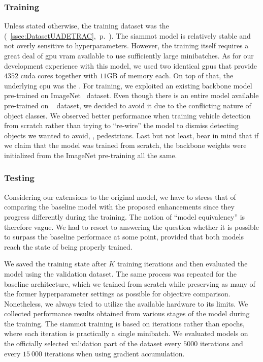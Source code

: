 \subsubsection{Training}

Unless stated otherwise, the training dataset was the \uadetrac{} (\sectiontext{}~\ref{ssec:DatasetUADETRAC},~p.~\pageref{ssec:DatasetUADETRAC}). The \gls{siammot} model is relatively stable and not overly sensitive to hyperparameters. However, the training itself requires a great deal of \gls{gpu} \gls{vram} available to use sufficiently large minibatches. As for our development experience with this model, we used two identical \usedgpu{} \glspl{gpu} that provide $4352$ \gls{cuda} cores together with $11$GB of memory each. On top of that, the underlying \gls{cpu} was the \usedcpu{}. For training, we exploited an existing backbone model pre-trained on ImageNet~\cite{deng2009imagenet} dataset. Even though there is an entire model available pre-trained on \mscoco{}~\cite{lin2014mscoco} dataset, we decided to avoid it due to the conflicting nature of object classes. We observed better performance when training vehicle detection from scratch rather than trying to ``re-wire'' the model to dismiss detecting objects we wanted to avoid, \egtext{}, pedestrians. Last but not least, bear in mind that if we claim that the model was trained from scratch, the backbone weights were initialized from the ImageNet pre-training all the same.

\subsubsection{Testing}

Considering our extensions to the original model, we have to stress that of comparing the baseline model with the proposed enhancements since they progress differently during the training. The notion of ``model equivalency'' is therefore vague. We had to resort to answering the question whether it is possible to surpass the baseline performace at some point, provided that both models reach the state of being properly trained.

We saved the training state after $K$ training iterations and then evaluated the model using the \uadetrac{} validation dataset. The same process was repeated for the baseline architecture, which we trained from scratch while preserving as many of the former hyperparameter settings as possible for objective comparison. Nonetheless, we always tried to utilize the available hardware to its limits. We collected performance results obtained from various stages of the model during the training. The \gls{siammot} training is based on iterations rather than epochs, where each iteration is practically a single minibatch. We evaluated models on the officially selected validation part of the dataset every $5000$ iterations and every $15\ 000$ iterations when using gradient accumulation.
